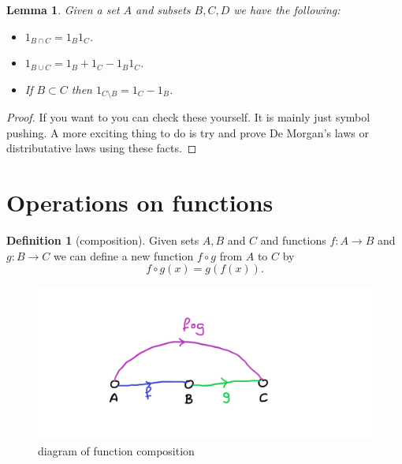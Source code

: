 \documentclass[
]{book}
\newtheorem{lemma}{Lemma}[chapter]
\theoremstyle{definition}
\newtheorem{definition}{Definition}[chapter]
\theoremstyle{definition}
\theoremstyle{definition}
\theoremstyle{definition}
\theoremstyle{remark}
\begin{document}
\begin{lemma}

Given a set \(A\) and subsets \(B, C, D\) we have the following:

\begin{itemize}
\item
  \(1_{B \cap C} = 1_{B}1_{C}\).
\item
  \(1_{B \cup C} = 1_B + 1_C - 1_B 1_C\).
\item
  If \(B \subset C\) then \(1_{C \setminus B} = 1_C - 1_B\).
\end{itemize}

\end{lemma}

\begin{proof}
If you want to you can check these yourself. It is mainly just symbol pushing. A more exciting thing to do is try and prove De Morgan's laws or distributative laws using these facts.
\end{proof}

\section{Operations on functions}\label{operations-on-functions}

\begin{definition}[composition]

Given sets \(A, B\) and \(C\) and functions \(f: A \rightarrow B\) and \(g: B \rightarrow C\) we can define a new function \(f \circ g\) from \(A\) to \(C\) by
\[ f\circ g(x) = g(f(x)).  \]

\begin{figure}
\centering
\includegraphics{compositiondiagram.png}
\caption{\label{fig:unnamed-chunk-17}diagram of function composition}
\end{figure}

\end{definition}
\end{document}
